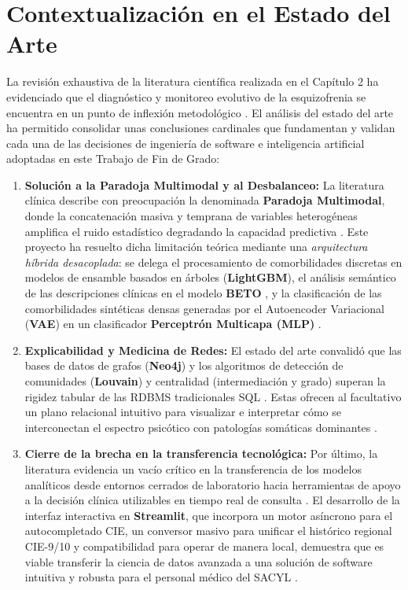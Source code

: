 \documentclass[12pt,a4paper,onecolumn,oneside]{report}
\begin{document}
\section{Contextualización en el Estado del Arte}

La revisión exhaustiva de la literatura científica realizada en el Capítulo 2 ha evidenciado que el diagnóstico y monitoreo evolutivo de la esquizofrenia se encuentra en un punto de inflexión metodológico \cite{saboori2025predictive,Tyagi}. El análisis del estado del arte ha permitido consolidar unas conclusiones cardinales que fundamentan y validan cada una de las decisiones de ingeniería de software e inteligencia artificial adoptadas en este Trabajo de Fin de Grado:

\begin{enumerate}
    
    \item \textbf{Solución a la Paradoja Multimodal y al Desbalanceo:} La literatura clínica describe con preocupación la denominada \textbf{Paradoja Multimodal}, donde la concatenación masiva y temprana de variables heterogéneas amplifica el ruido estadístico degradando la capacidad predictiva \cite{saboori2025predictive}. Este proyecto ha resuelto dicha limitación teórica mediante una \textit{arquitectura híbrida desacoplada}: se delega el procesamiento de comorbilidades discretas en modelos de ensamble basados en árboles (\textbf{LightGBM}), el análisis semántico de las descripciones clínicas en el modelo \textbf{BETO} \cite{canete2020beto, vidal2023algoritmo}, y la clasificación de las comorbilidades sintéticas densas generadas por el Autoencoder Variacional (\textbf{VAE}) en un clasificador \textbf{Perceptrón Multicapa (MLP)} \cite{saboori2025predictive, jimenez2023xai}.
    
    \item \textbf{Explicabilidad y Medicina de Redes:} El estado del arte convalidó que las bases de datos de grafos (\textbf{Neo4j}) y los algoritmos de detección de comunidades (\textbf{Louvain}) y centralidad (intermediación y grado) superan la rigidez tabular de las RDBMS tradicionales SQL \cite{yousif2025real}. Estas ofrecen al facultativo un plano relacional intuitivo para visualizar e interpretar cómo se interconectan el espectro psicótico con patologías somáticas dominantes \cite{barabasi2011network, hidalgo2009dynamic}.
    
    \item \textbf{Cierre de la brecha en la transferencia tecnológica:} Por último, la literatura evidencia un vacío crítico en la transferencia de los modelos analíticos desde entornos cerrados de laboratorio hacia herramientas de apoyo a la decisión clínica utilizables en tiempo real de consulta \cite{lopez2026ia}. El desarrollo de la interfaz interactiva en \textbf{Streamlit}, que incorpora un motor asíncrono para el autocompletado CIE, un conversor masivo para unificar el histórico regional CIE-9/10 y compatibilidad para operar de manera local, demuestra que es viable transferir la ciencia de datos avanzada a una solución de software intuitiva y robusta para el personal médico del SACYL \cite{lopez2026ia}.
\end{enumerate}
\end{document}

